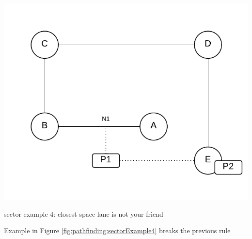 \begin{marginfigure}
	\includegraphics{res/pathfinding/PathFindingSector4.pdf}
    \caption{sector example 4: closest space lane is not your friend}
	\label{fig:pathfinding:sectorExample4}
\end{marginfigure}

Example in Figure \ref{fig:pathfinding:sectorExample4} breaks the previous rule 







